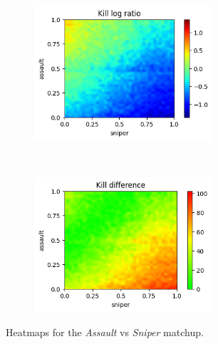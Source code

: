 \begin{figure}[H]
    \centering
    \begin{subfigure}[t]{0.5\textwidth}
        \centering
        \includegraphics[height=5cm]{Images/images/heatmaps/long-range/assault_sniper_heatmap_ratio.png}
    \end{subfigure}%
    ~ 
    \begin{subfigure}[t]{0.5\textwidth}
        \centering
        \includegraphics[height=5cm]{Images/images/heatmaps/long-range/assault_sniper_heatmap_diff.png}
    \end{subfigure}
    \caption{Heatmaps for the \textit{Assault} vs \textit{Sniper} matchup.}
    \label{fig:balance_assault_sniper_long}
\end{figure}

